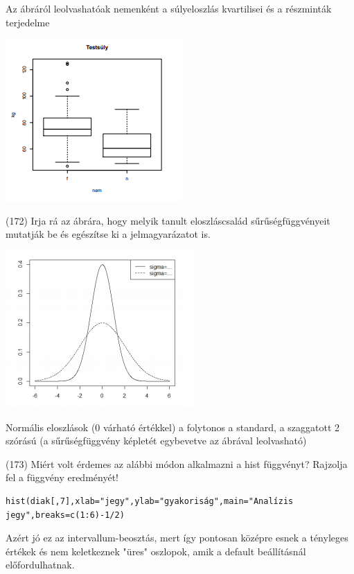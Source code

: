 \documentclass[12p]{article}
\begin{document}
Az ábráról leolvashatóak nemenként a súlyeloszlás kvartilisei és a részminták terjedelme

\includegraphics{boxplot}

(172) Irja rá az ábrára, hogy melyik tanult eloszláscsalád sűrűségfüggvényeit mutatják be és
egészítse ki a jelmagyarázatot is.

\includegraphics{fuggveny}

 Normális eloszlások (0 várható értékkel) a folytonos a standard, a szaggatott 2 szórású
(a sűrűségfüggvény képletét egybevetve az ábrával leolvasható)


(173) Miért volt érdemes az alábbi módon alkalmazni a hist függvényt? Rajzolja fel a függvény eredményét! 

\begin{verbatim}
hist(diak[,7],xlab="jegy",ylab="gyakoriság",main="Analízis
jegy",breaks=c(1:6)-1/2)
\end{verbatim}

Azért jó ez az intervallum-beosztás, mert így pontosan középre esnek a tényleges értékek
és nem keletkeznek "üres" oszlopok, amik a default beállításnál előfordulhatnak.
\end{document}
